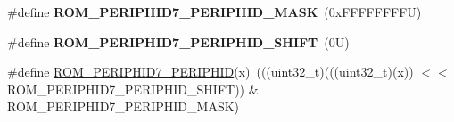 \begin{DoxyCompactItemize}
\mbox{\label{group___m_t_b___register___masks_ga46d62ff696136480044fa6bd78597be6}} 
\#define {\bfseries R\+O\+M\+\_\+\+P\+E\+R\+I\+P\+H\+I\+D7\+\_\+\+P\+E\+R\+I\+P\+H\+I\+D\+\_\+\+M\+A\+SK}~(0x\+F\+F\+F\+F\+F\+F\+F\+F\+U)
\item 
\mbox{\label{group___m_t_b___register___masks_ga660f3354bf252cb5c5a72b828ba683bd}} 
\#define {\bfseries R\+O\+M\+\_\+\+P\+E\+R\+I\+P\+H\+I\+D7\+\_\+\+P\+E\+R\+I\+P\+H\+I\+D\+\_\+\+S\+H\+I\+FT}~(0\+U)
\item 
\#define \mbox{\hyperlink{group___m_t_b___register___masks_ga954df1566228d34b0f016073d865e878}{R\+O\+M\+\_\+\+P\+E\+R\+I\+P\+H\+I\+D7\+\_\+\+P\+E\+R\+I\+P\+H\+ID}}(x)~(((uint32\+\_\+t)(((uint32\+\_\+t)(x)) $<$$<$ R\+O\+M\+\_\+\+P\+E\+R\+I\+P\+H\+I\+D7\+\_\+\+P\+E\+R\+I\+P\+H\+I\+D\+\_\+\+S\+H\+I\+FT)) \& R\+O\+M\+\_\+\+P\+E\+R\+I\+P\+H\+I\+D7\+\_\+\+P\+E\+R\+I\+P\+H\+I\+D\+\_\+\+M\+A\+SK)
\end{DoxyCompactItemize}
